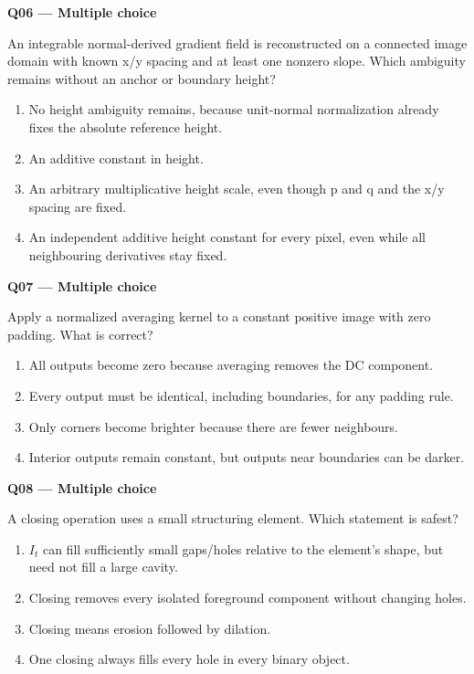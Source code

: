 \documentclass[11pt,a4paper]{article}
\begin{document}
\begin{minipage}{\linewidth}
\textbf{Q06 — Multiple choice}\par\smallskip
An integrable normal-derived gradient field is reconstructed on a connected image domain with known x/\allowbreak{}y spacing and at least one nonzero slope. Which ambiguity remains without an anchor or boundary height?
\begin{enumerate}[label=\textbf{\Alph*.}]
\item No height ambiguity remains,\allowbreak{} because unit-normal normalization already fixes the absolute reference height.
\item An additive constant in height.
\item An arbitrary multiplicative height scale,\allowbreak{} even though p and q and the x/\allowbreak{}y spacing are fixed.
\item An independent additive height constant for every pixel,\allowbreak{} even while all neighbouring derivatives stay fixed.
\end{enumerate}
\end{minipage}
\par\vspace{12pt}
\begin{minipage}{\linewidth}
\textbf{Q07 — Multiple choice}\par\smallskip
Apply a normalized averaging kernel to a constant positive image with zero padding. What is correct?
\begin{enumerate}[label=\textbf{\Alph*.}]
\item All outputs become zero because averaging removes the DC component.
\item Every output must be identical,\allowbreak{} including boundaries,\allowbreak{} for any padding rule.
\item Only corners become brighter because there are fewer neighbours.
\item Interior outputs remain constant,\allowbreak{} but outputs near boundaries can be darker.
\end{enumerate}
\end{minipage}
\par\vspace{12pt}
\begin{minipage}{\linewidth}
\textbf{Q08 — Multiple choice}\par\smallskip
A closing operation uses a small structuring element. Which statement is safest?
\begin{enumerate}[label=\textbf{\Alph*.}]
\item \(I_t\) can fill sufficiently small gaps/\allowbreak{}holes relative to the element's shape,\allowbreak{} but need not fill a large cavity.
\item Closing removes every isolated foreground component without changing holes.
\item Closing means erosion followed by dilation.
\item One closing always fills every hole in every binary object.
\end{enumerate}
\end{minipage}
\end{document}
